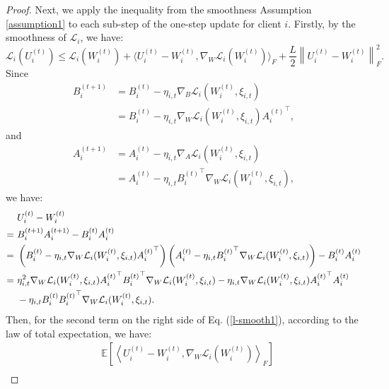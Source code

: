 \begin{proof}
Next, we apply the inequality from the smoothness Assumption \ref{assumption1} to each sub-step of the one-step update for client $i$.
Firstly, by the smoothness of $\mathcal{L}_i$, we have:
\begin{equation}\label{l-smooth1}
\mathcal{L}_i(U_i^{(t)}) \leq \mathcal{L}_i(W_i^{(t)})+\langle U_i^{(t)}-W_i^{(t)}, \nabla_{W}\mathcal{L}_i(W_i^{(t)})\rangle_F+\frac{L}{2}\left\|U_i^{(t)}-W_i^{(t)}\right\|^2_F.
\end{equation}
Since
\begin{equation*}
\begin{aligned}
B_i^{(t+1)} &= B_i^{(t)} - \eta_{i,t}\nabla_{B}\mathcal{L}_i(W_i^{(t)},\xi_{i,t})\\
&= B_i^{(t)} - \eta_{i,t} \nabla_{W}\mathcal{L}_i(W_i^{(t)},\xi_{i,t}){A_i^{(t)}}^{\top},
\end{aligned}
\end{equation*}
and
\begin{align*}
A_i^{(t+1)} &= A_i^{(t)} - \eta_{i,t}\nabla_{A}\mathcal{L}_i(W_i^{(t)},\xi_{i,t})\\
&= A_i^{(t)} - \eta_{i,t}{B_i^{(t)}}^{\top}\nabla_{W}\mathcal{L}_i(W_i^{(t)},\xi_{i,t}),
\end{align*}
we have:
\begin{equation} \label{u_w_difference}
\begin{aligned}
& U_i^{(t)}-W_i^{(t)} \notag\\
= \ & B_i^{(t+1)}A_i^{(t+1)}-B_i^{(t)}A_i^{(t)}\notag\\
= \ & \left(B_i^{(t)} - \eta_{i,t}\nabla_{W}\mathcal{L}_i(W_i^{(t)},\xi_{i,t}){A_i^{(t)}}^{\top}\right)\left(A_i^{(t)} - \eta_{i,t}{B_i^{(t)}}^{\top}\nabla_{W}\mathcal{L}_i(W_i^{(t)},\xi_{i,t})\right) - B_i^{(t)}A_i^{(t)}\notag\\
= \ & \eta_{i,t}^2 \nabla_{W}\mathcal{L}_i(W_i^{(t)},\xi_{i,t}){A_i^{(t)}}^{\top}{B_i^{(t)}}^{\top}\nabla_{W}\mathcal{L}_i(W_i^{(t)},\xi_{i,t})- \eta_{i,t}\nabla_{W}\mathcal{L}_i(W_i^{(t)},\xi_{i,t}){A_i^{(t)}}^{\top}A_i^{(t)}\notag\\
& - \eta_{i,t}B_i^{(t)}{B_i^{(t)}}^{\top}\nabla_{W}\mathcal{L}_i(W_i^{(t)},\xi_{i,t}).
\end{aligned}
\end{equation}
Then, for the second term on the right side of Eq. (\ref{l-smooth1}), according to the law of total expectation, we have:
\begin{align*}
& \mathbb{E}\left[\left\langle U_i^{(t)}-W_i^{(t)}, \nabla_{W}\mathcal{L}_i(W_i^{(t)})\right\rangle_F\right]\\

\end{align*}
\end{proof}
